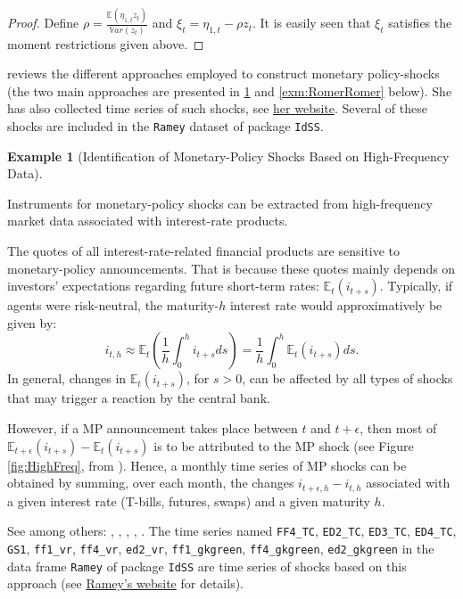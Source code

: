 \documentclass[
  12pt,
]{book}
\theoremstyle{definition}
\theoremstyle{definition}
\newtheorem{example}{Example}[chapter]
\theoremstyle{definition}
\theoremstyle{definition}
\theoremstyle{remark}
\begin{document}
\begin{proof}
Define \(\rho = \frac{\mathbb{E}(\eta_{1,t}z_t)}{\mathbb{V}ar(z_t)}\) and \(\xi_t = \eta_{1,t} - \rho z_t\). It is easily seen that \(\xi_t\) satisfies the moment restrictions given above.
\end{proof}

\citet{Ramey_2016_NBER} reviews the different approaches employed to construct monetary policy-shocks (the two main approaches are presented in \ref{exm:HighFreq} and \ref{exm:RomerRomer} below). She has also collected time series of such shocks, see \href{https://econweb.ucsd.edu/~vramey/research.html\#mon}{her website}. Several of these shocks are included in the \texttt{Ramey} dataset of package \texttt{IdSS}.

\begin{example}[Identification of Monetary-Policy Shocks Based on High-Frequency Data]
\protect\hypertarget{exm:HighFreq}{}\label{exm:HighFreq}

Instruments for monetary-policy shocks can be extracted from high-frequency market data associated with interest-rate products.

The quotes of all interest-rate-related financial products are sensitive to monetary-policy announcements. That is because these quotes mainly depends on investors' expectations regarding future short-term rates: \(\mathbb{E}_t(i_{t+s})\). Typically, if agents were risk-neutral, the maturity-\(h\) interest rate would approximatively be given by:
\[
i_{t,h} \approx \mathbb{E}_t\left(\frac{1}{h}\int_{0}^{h} i_{t+s} ds\right) = \frac{1}{h}\int_{0}^{h} \mathbb{E}_t\left(i_{t+s}\right) ds.
\]
In general, changes in \(\mathbb{E}_t(i_{t+s})\), for \(s>0\), can be affected by all types of shocks that may trigger a reaction by the central bank.

However, if a MP announcement takes place between \(t\) and \(t+\epsilon\), then most of \(\mathbb{E}_{t+\epsilon}(i_{t+s})-\mathbb{E}_t(i_{t+s})\) is to be attributed to the MP shock (see Figure \ref{fig:HighFreq}, from \citet{Gurkaynak_et_al_2005}). Hence, a monthly time series of MP shocks can be obtained by summing, over each month, the changes \(i_{t+ \epsilon,h} - i_{t,h}\) associated with a given interest rate (T-bills, futures, swaps) and a given maturity \(h\).

See among others: \citet{KUTTNER2001523}, \citet{Cochrane_Piazzesi_2002}, \citet{Gurkaynak_et_al_2005}, \citet{Piazzesi_Swanson_2008}, \citet{Gertler_Karadi_2015}. The time series named
\texttt{FF4\_TC}, \texttt{ED2\_TC}, \texttt{ED3\_TC}, \texttt{ED4\_TC}, \texttt{GS1}, \texttt{ff1\_vr}, \texttt{ff4\_vr}, \texttt{ed2\_vr}, \texttt{ff1\_gkgreen}, \texttt{ff4\_gkgreen}, \texttt{ed2\_gkgreen} in the data frame \texttt{Ramey} of package \texttt{IdSS} are time series of shocks based on this approach (see \href{https://econweb.ucsd.edu/~vramey/research/Ramey_HOM_monetary.zip}{Ramey's website} for details).


\end{example}
\end{document}

